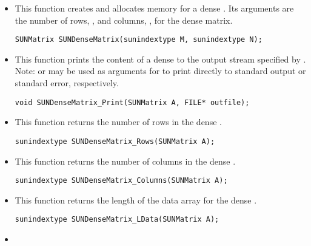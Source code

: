 \begin{itemize}


\item {}

  This function creates and allocates memory for a dense .
  Its arguments are the number of rows, , and columns, , for
  the dense matrix.

  \verb|SUNMatrix SUNDenseMatrix(sunindextype M, sunindextype N);|


\item {}

  This function prints the content of a dense  to the
  output stream specified by .  Note: 
  or  may be used as arguments for  to print
  directly to standard output or standard error, respectively.
 
  \verb|void SUNDenseMatrix_Print(SUNMatrix A, FILE* outfile);|


\item {}

  This function returns the number of rows in the dense .
 
  \verb|sunindextype SUNDenseMatrix_Rows(SUNMatrix A);|


\item {}

  This function returns the number of columns in the dense .
 
  \verb|sunindextype SUNDenseMatrix_Columns(SUNMatrix A);|


\item {}

  This function returns the length of the data array for the dense .
 
  \verb|sunindextype SUNDenseMatrix_LData(SUNMatrix A);|


\item {}


\end{itemize}
